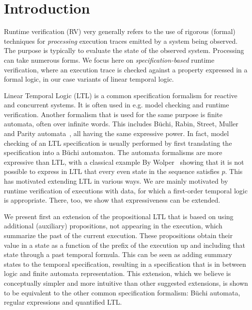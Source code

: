 \section{Introduction}

Runtime verification (RV)  \cite{bartocci18,havelund-rv-data-2018} very generally refers to the use of rigorous (formal) 
techniques for {\em processing} execution traces emitted by a system being observed. The purpose is typically
to evaluate the state of the observed system. Processing can take numerous
forms. We focus here on {\em specification-based} runtime verification, where an execution trace is checked against a property expressed in a formal logic, in our case variants of linear temporal logic.

Linear Temporal Logic (LTL) is a common specification formalism for reactive and concurrent systems. It is often used in e.g. model checking and runtime verification. Another formalism that is used for the same purpose is finite automata, often over infinite words. This includes B\"{u}chi, Rabin, Street, Muller and Parity automata~\cite{Thomas}, all having the same expressive power. In fact, model checking of an LTL specification
is usually performed by first translating the specification into a B\"{u}chi automaton. The automata formalisms are more expressive than LTL, with a classical example By Wolper~\cite{Wolper} showing that
it is not possible to express in LTL that every even state in
the sequence satisfies $p$. This has motivated extending LTL
in various ways.
We are mainly motivated by runtime verification of executions with data, for which a first-order temporal logic is
appropriate. There, too, we show that expressiveness can be extended.

We present first an extension of the propositional LTL that is based on using additional (auxiliary) propositions, not appearing in the execution, which summarize the past 
of the current execution. These propositions obtain their value in a state as a function of the prefix of the execution up and including that state through a past temporal formula. This can be seen as adding
summary states to the temporal specification, resulting in a specification that is in between logic and finite automata representation. This extension, which we believe is conceptually simpler
and more intuitive than other suggested extensions, is shown to be
equivalent to the other common specification formalism:
B\"{u}chi automata, regular expressions and quantified LTL.

